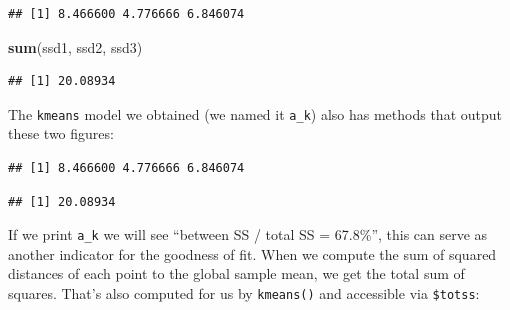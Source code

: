 \documentclass[]{article}
\newenvironment{Shaded}{\begin{snugshade}}{\end{snugshade}}
\newcommand{\DecValTok}[1]{\textcolor[rgb]{0.00,0.00,0.81}{#1}}
\newcommand{\KeywordTok}[1]{\textcolor[rgb]{0.13,0.29,0.53}{\textbf{#1}}}
\newcommand{\NormalTok}[1]{#1}
\newcommand{\OperatorTok}[1]{\textcolor[rgb]{0.81,0.36,0.00}{\textbf{#1}}}
\newcommand{\StringTok}[1]{\textcolor[rgb]{0.31,0.60,0.02}{#1}}
\begin{document}
\begin{verbatim}
## [1] 8.466600 4.776666 6.846074
\end{verbatim}

\begin{Shaded}
\begin{Highlighting}[]
\KeywordTok{sum}\NormalTok{(ssd1, ssd2, ssd3)}
\end{Highlighting}
\end{Shaded}

\begin{verbatim}
## [1] 20.08934
\end{verbatim}

The \texttt{kmeans} model we obtained (we named it \texttt{a\_k}) also
has methods that output these two figures:

\begin{Shaded}
\end{Shaded}

\begin{verbatim}
## [1] 8.466600 4.776666 6.846074
\end{verbatim}

\begin{Shaded}
\end{Shaded}

\begin{verbatim}
## [1] 20.08934
\end{verbatim}

If we print \texttt{a\_k} we will see ``between SS / total SS =
67.8\%'', this can serve as another indicator for the goodness of fit.
When we compute the sum of squared distances of each point to the global
sample mean, we get the total sum of squares. That's also computed for
us by \texttt{kmeans()} and accessible via \texttt{\$totss}:

\begin{Shaded}
\end{Shaded}
\end{document}

